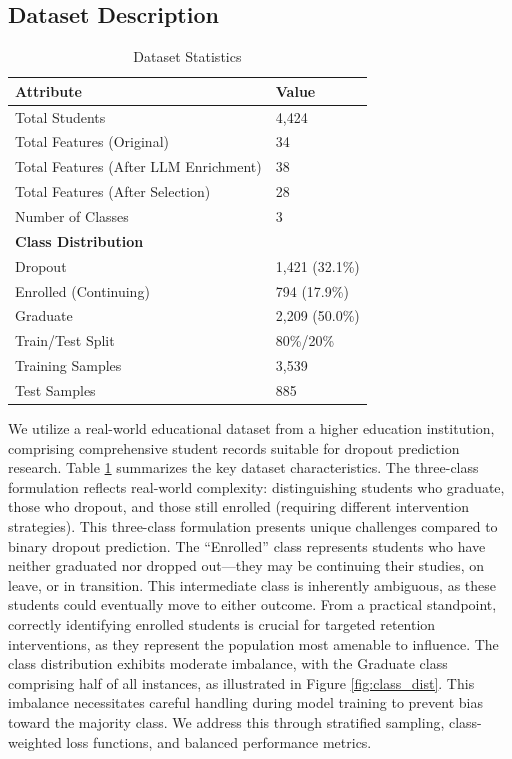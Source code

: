 \documentclass[journal]{IEEEtran}
\begin{document}
\subsection{Dataset Description}
\begin{table}[h]
\centering
\caption{Dataset Statistics}
\label{tab:dataset_stats}
\begin{tabular}{ll}
\toprule
\textbf{Attribute} & \textbf{Value} \\
\midrule
Total Students & 4,424 \\
Total Features (Original) & 34 \\
Total Features (After LLM Enrichment) & 38 \\
Total Features (After Selection) & 28 \\
Number of Classes & 3 \\
\midrule
\multicolumn{2}{l}{\textbf{Class Distribution}} \\
\quad Dropout & 1,421 (32.1\%) \\
\quad Enrolled (Continuing) & 794 (17.9\%) \\
\quad Graduate & 2,209 (50.0\%) \\
\midrule
Train/Test Split & 80\%/20\% \\
Training Samples & 3,539 \\
Test Samples & 885 \\
\bottomrule
\end{tabular}
\end{table}
We utilize a real-world educational dataset from a higher education institution, comprising comprehensive student records suitable for dropout prediction research. Table \ref{tab:dataset_stats} summarizes the key dataset characteristics.
The three-class formulation reflects real-world complexity: distinguishing students who graduate, those who dropout, and those still enrolled (requiring different intervention strategies).
This three-class formulation presents unique challenges compared to binary dropout prediction. The ``Enrolled'' class represents students who have neither graduated nor dropped out---they may be continuing their studies, on leave, or in transition. This intermediate class is inherently ambiguous, as these students could eventually move to either outcome. From a practical standpoint, correctly identifying enrolled students is crucial for targeted retention interventions, as they represent the population most amenable to influence.
The class distribution exhibits moderate imbalance, with the Graduate class comprising half of all instances, as illustrated in Figure \ref{fig:class_dist}. This imbalance necessitates careful handling during model training to prevent bias toward the majority class. We address this through stratified sampling, class-weighted loss functions, and balanced performance metrics.
\end{document}
